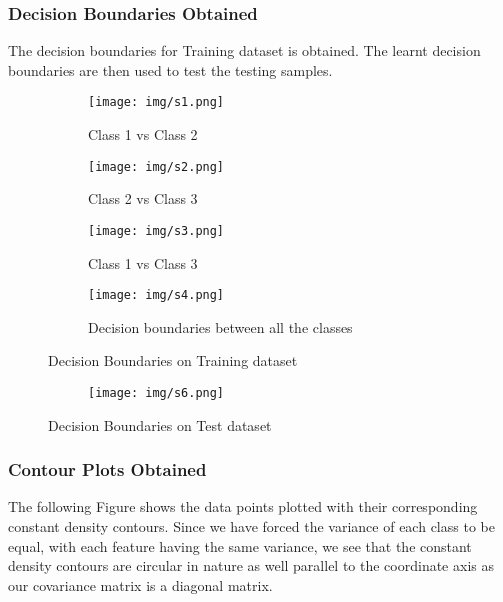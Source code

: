 \subsubsection{Decision Boundaries Obtained}
The decision boundaries for Training dataset is obtained. The learnt decision boundaries are then used to test the testing samples.
\begin{figure}[!hbt]
    \begin{subfigure}{0.49\textwidth}
        \texttt{[image: img/s1.png]}
        \caption{Class 1 vs Class 2 }
    \end{subfigure}%
    \hfill
    \begin{subfigure}{0.49\textwidth}
        \texttt{[image: img/s2.png]}
        \caption{Class 2 vs Class 3}
    \end{subfigure}
    
    \begin{subfigure}{0.49\textwidth}
        \texttt{[image: img/s3.png]}
        \caption{Class 1 vs Class 3}
    \end{subfigure}%
    \hfill
    \begin{subfigure}{0.49\textwidth}
        \texttt{[image: img/s4.png]}
        \caption{Decision boundaries between all the classes}
    \end{subfigure}
    
    \caption{Decision Boundaries on Training dataset}
    \label{fig:Figure9}

\end{figure}

\begin{figure}[!hbt]
\centering
\begin{subfigure}{0.49\textwidth}
        \texttt{[image: img/s6.png]}
    \end{subfigure}
\caption{Decision Boundaries on Test dataset}
\label{fig:Figure10}

\end{figure}

\subsubsection{Contour Plots Obtained}
The following Figure shows the data points plotted with their corresponding constant density contours. Since we have forced the variance of each class to be equal, with each feature having the same variance, we see that the constant density contours are circular in nature as well parallel to the coordinate axis as our covariance matrix is a diagonal matrix.

